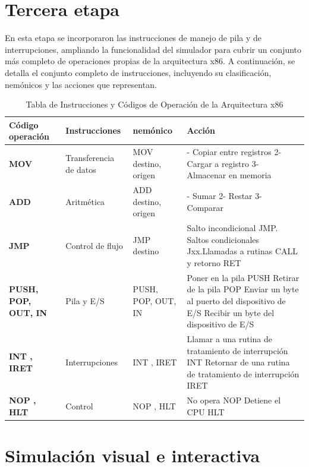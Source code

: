\documentclass[12pt,oneside]{templates/unerthesis}
\begin{document}
\hypertarget{tercera-etapa}{%
\section{Tercera etapa}\label{tercera-etapa}}

En esta etapa se incorporaron las instrucciones de manejo de pila y de interrupciones, ampliando la funcionalidad del simulador para cubrir un conjunto más completo de operaciones propias de la arquitectura x86.
A continuación, se detalla el conjunto completo de instrucciones, incluyendo su clasificación, nemónicos y las acciones que representan.

\begin{longtable}[t]{>{\raggedright\arraybackslash}p{4cm}|>{\raggedright\arraybackslash}p{5cm}>{\raggedright\arraybackslash}p{5cm}>{\raggedright\arraybackslash}p{6cm}}
\caption{\label{tab:isacompleta}Tabla de Instrucciones y Códigos de Operación de la Arquitectura x86}\\
\toprule
\textbf{Código operación} & \textbf{Instrucciones} & \textbf{nemónico} & \textbf{Acción}\\
\midrule
\textbf{MOV} & Transferencia de datos & MOV destino, origen & 1- Copiar entre registros 2- Cargar a registro 3- Almacenar en memoria\\
\textbf{ADD} & Aritmética & ADD destino, origen & 1- Sumar  2- Restar 3- Comparar\\
\textbf{JMP} & Control de flujo & JMP destino & Salto incondicional JMP. Saltos condicionales Jxx.Llamadas a rutinas CALL y retorno RET\\
\textbf{PUSH, POP, OUT, IN} & Pila y E/S & PUSH, POP, OUT, IN & Poner en la pila PUSH Retirar de la pila POP Enviar un byte al puerto del dispositivo de E/S Recibir un byte del dispositivo de E/S\\
\textbf{INT , IRET} & Interrupciones & INT , IRET & Llamar a una rutina de tratamiento de interrupción INT Retornar de una rutina de tratamiento de interrupción IRET\\
\addlinespace
\textbf{NOP , HLT} & Control & NOP , HLT & No opera NOP Detiene el CPU HLT\\
\bottomrule
\end{longtable}

\hypertarget{simulaciuxf3n-visual-e-interactiva}{%
\section{Simulación visual e interactiva}\label{simulaciuxf3n-visual-e-interactiva}}
\end{document}
